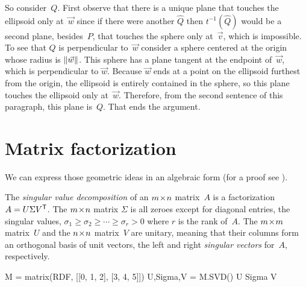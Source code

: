 So consider~$Q$.
First observe that there is a unique plane that touches the ellipsoid
only at~$\vec{w}$ since if there were another $\hat{Q}$ then $t^{-1}(\hat{Q})$
would be a second plane, besides~$P$, 
that touches the sphere only at~$\vec{v}$, which is impossible.
To see that $Q$ is perpendicular to~$\vec{w}$ consider a sphere
centered at the origin whose radius is $\|\vec{w}\|$.
This sphere has a plane tangent at the endpoint of~$\vec{w}$, 
which is perpendicular
to $\vec{w}$.
Because $\vec{w}$ ends at a point on the ellipsoid furthest from the origin,
the ellipsoid is entirely contained in the sphere, so this plane touches
the ellipsoid only at~$\vec{w}$.
Therefore, from the second sentence of this paragraph, this plane is~$Q$. 
That ends the argument.



\section{Matrix factorization}

We can express those geometric ideas in an algebraic form
(for a proof see \cite{TrefethenBau97}).

The \textit{singular value decomposition} of an $m \! \times \! n$ matrix~$A$
is a factorization $A=U\Sigma {{V}^{\textsf{T}}}$.
The $m \! \times \! n$ matrix $\Sigma$ 
is all zeroes except for diagonal entries, the singular values, 
$\sigma_1\geq \sigma_2 \geq \cdots \geq \sigma_r> 0$ where $r$ is the
rank of~$A$.
The $m \! \times \! m$ matrix~$U$ and the $n \! \times \! n$ matrix~$V$ are unitary, meaning
that their columns form an orthogonal basis of unit vectors, the left and 
right \textit{singular vectors} for~$A$, respectively. 
\begin{sageoutput}
M = matrix(RDF, [[0, 1, 2], [3, 4, 5]])
U,Sigma,V = M.SVD()
U
Sigma
V  
\end{sageoutput}

